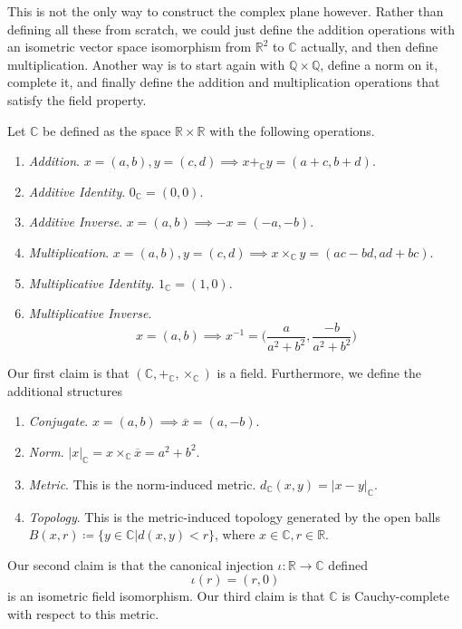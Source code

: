   This is not the only way to construct the complex plane however. Rather than defining all these from scratch, we could just define the addition operations with an isometric vector space isomorphism from $\mathbb{R}^2$ to $\mathbb{C}$ actually, and then define multiplication. Another way is to start again with $\mathbb{Q} \times \mathbb{Q}$, define a norm on it, complete it, and finally define the addition and multiplication operations that satisfy the field property.   

  \begin{theorem}
    Let $\mathbb{C}$ be defined as the space $\mathbb{R} \times \mathbb{R}$ with the following operations. 
    \begin{enumerate}
      \item \textit{Addition}. $x = (a, b), y = (c, d) \implies x +_{\mathbb{C}} y = (a + c, b + d)$. 
      \item \textit{Additive Identity}. $0_{\mathbb{C}} = (0, 0)$. 
      \item \textit{Additive Inverse}. $x = (a, b) \implies -x = (-a, -b)$. 
      \item \textit{Multiplication}. $x = (a, b), y = (c, d) \implies x \times_{\mathbb{C}} y = (ac - bd, ad + bc)$. 
      \item \textit{Multiplicative Identity}. $1_{\mathbb{C}} = (1, 0)$. 
      \item \textit{Multiplicative Inverse}. 
      \begin{equation}
        x = (a, b) \implies x^{-1} = \bigg( \frac{a}{a^2 + b^2}, \frac{-b}{a^2 + b^2} \bigg)
      \end{equation}
    \end{enumerate}
    Our first claim is that $(\mathbb{C}, +_{\mathbb{C}}, \times_{\mathbb{C}})$ is a field. Furthermore, we define the additional structures
    \begin{enumerate}
      \item \textit{Conjugate}. $x = (a, b) \implies \overline{x} = (a, -b)$. 
      \item \textit{Norm}. $|x|_{\mathbb{C}} = x \times_{\mathbb{C}} \overline{x} = a^2 + b^2$. 
      \item \textit{Metric}. This is the norm-induced metric. $d_{\mathbb{C}}(x, y) = |x - y|_{\mathbb{C}}$. 
      \item \textit{Topology}. This is the metric-induced topology generated by the open balls $B(x, r) \coloneqq \{y \in \mathbb{C} | d(x, y) < r\}$, where $x \in \mathbb{C}, r \in \mathbb{R}$. 
    \end{enumerate} 
    Our second claim is that the canonical injection $\iota: \mathbb{R} \rightarrow \mathbb{C}$ defined 
    \begin{equation}
      \iota(r) = (r, 0)
    \end{equation}
    is an isometric field isomorphism. Our third claim is that $\mathbb{C}$ is Cauchy-complete with respect to this metric. 
  \end{theorem} 

